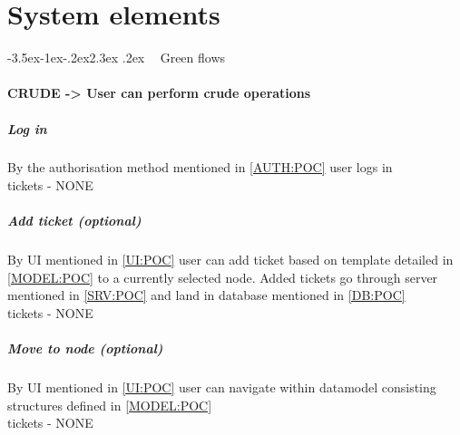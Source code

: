 \documentclass[12pt,a4paper,twoside]{article}
\makeatletter
\def\section{\@startsection{section}{1}{\z@ }%
  {-3.5ex\@plus -1ex\@minus -.2ex}{2.3ex \@plus .2ex}%
  {\noindent\normalfont \Large \bfseries \ }%
}
\makeatother
\begin{document}
\label{channels}
\label{channels:1}

\label{revenue}
\label{revenue:1}
\label{revenue:2}
\label{revenue:3}

\label{cost}
\label{cost:1}
\label{cost:2}

\label{metrics}
\label{metrics:2}
\secstarter
{}\label{metrics:2:1}
\label{metrics:2:2}
\label{metrics:2:3}
\secend

\label{relation}
\label{relation:3}
\label{relation:1}
\label{relation:2}




\newpage
\part{System elements}
\section{Green flows}
\subsection{CRUDE -> User can perform crude operations}
\subsubsection{Log in}\label{GF:LOGIN}
By the authorisation method mentioned in \ref{AUTH:POC} user logs in \\
tickets - NONE
\subsubsection{Add ticket (optional)}\label{GF:ADD}
By UI mentioned in \ref{UI:POC} user can add ticket based on template detailed in \ref{MODEL:POC} 
to a currently selected node. Added tickets go through server mentioned in \ref{SRV:POC} and land in database mentioned in \ref{DB:POC}\\
tickets - NONE
\subsubsection{Move to node (optional)}
By UI mentioned in \ref{UI:POC} user can navigate within datamodel consisting structures defined in \ref{MODEL:POC}\\
tickets - NONE
\end{document}
